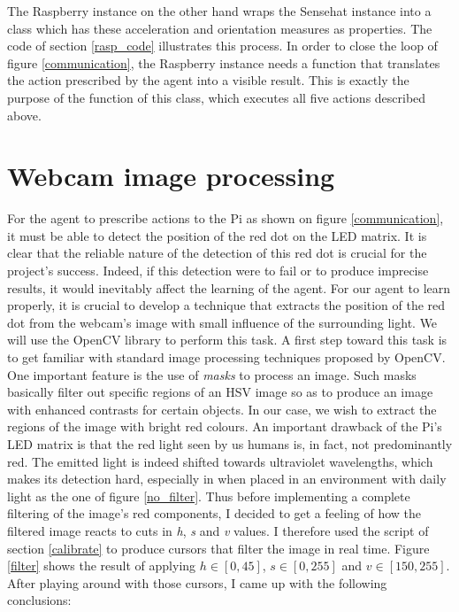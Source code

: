 The Raspberry instance on the other hand wraps the Sensehat instance into a class which has these acceleration and orientation measures as properties.  The code of section \ref{rasp_code} illustrates this process. In order to close the loop of figure \ref{communication}, the Raspberry instance needs a function that translates the action prescribed by the agent into a visible result. This is exactly the purpose of the  \texttt{} function of this class, which executes all five actions described above.

\section{Webcam image processing}

For the agent to prescribe actions to the Pi as shown on figure \ref{communication}, it must be able to detect the position of the red dot on the LED matrix. It is clear that the reliable nature of the detection of this red dot is crucial for the project's success. Indeed, if this detection were to fail or to produce imprecise results, it would inevitably affect the learning of the agent. For our agent to learn properly, it is crucial to develop a technique that extracts the position of the red dot from the webcam's image with small influence of the surrounding light. We will use the OpenCV library to perform this task. A first step toward this task is to get familiar with standard image processing techniques proposed by OpenCV. One important feature is the use of \textit{masks} to process an image. Such masks basically filter out specific regions of an HSV image so as to produce an image with enhanced contrasts for certain objects. In our case, we wish to extract the regions of the image with bright red colours. An important drawback of the Pi's LED matrix is that the red light seen by us humans is, in fact, not predominantly red. The emitted light is indeed shifted towards ultraviolet wavelengths, which makes its detection hard, especially in when placed in an environment with daily light as the one of figure \ref{no_filter}. Thus before implementing a complete filtering of the image's red components, I decided to get a feeling of how the filtered image reacts to cuts in \textit{h}, \textit{s} and \textit{v} values. I therefore used the script of section \ref{calibrate} to produce cursors that filter the image in real time. Figure \ref{filter} shows the result of applying $h \in [0, 45] $,  $s \in [0, 255]$ and $v \in [150, 255]$. After playing around with those cursors, I came up with the following conclusions:

